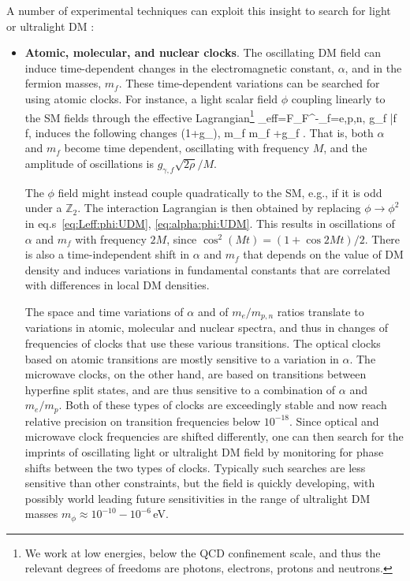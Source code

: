 A number of experimental techniques can exploit this insight to search for light or ultralight DM \cite{ultra:light:DM}:
\begin{itemize}
\item[$\diamond$]
{\bf Atomic, molecular, and nuclear clocks}. 
The oscillating DM field can induce time-dependent changes in the electromagnetic constant, $\alpha$, and in the fermion masses, $m_f$.
These time-dependent variations can be searched for using atomic clocks. 
For instance, a light scalar field $\phi$ coupling linearly to the SM fields through the effective Lagrangian\footnote{We work at low energies, below the QCD confinement scale, and thus the relevant degrees of freedoms are photons, electrons, protons and neutrons.}
\beq
\label{eq:Leff:phi:UDM}
\Lag_{\rm eff}=\phi F_{\mu\nu}F^{\mu\nu}-\sum_{f=e,p,n,} g_f \phi \bar f f,
\eeq
induces the following changes 
\beq
\label{eq:alpha:phi:UDM}
\alpha\to {}\simeq \alpha  \big(1+g_\gamma\phi \big), \qquad m_f \to m_f +g_f \phi.
\eeq
That is, both $\alpha$ and $m_f$ become time dependent, 
oscillating with frequency $M$, and the amplitude of oscillations is $g_{\gamma,f}\sqrt{2 \rho}/M$. 

The $\phi$ field might instead couple quadratically to the SM, e.g., if it is odd under a $\mathbb{Z}_2$. 
The interaction Lagrangian is then obtained by replacing $\phi\to \phi^2$ in eq.s~\eqref{eq:Leff:phi:UDM}, \eqref{eq:alpha:phi:UDM}.   
This results in oscillations of $\alpha$ and $m_f$ with frequency $2M$, since $\cos^2(M t)=(1+\cos 2Mt )/2$. There is also a time-independent shift in $\alpha$ and $m_f$ that depends on the value of DM density and induces variations in fundamental constants that are correlated with differences in local DM densities. 

The space and time variations of $\alpha$ and of $m_e/m_{p,n}$ ratios 
translate to variations in atomic, molecular and nuclear spectra, 
and thus in changes of frequencies of clocks that use these various transitions. 
The optical clocks based on atomic transitions are mostly sensitive to a variation in $\alpha$. The microwave clocks, on the other hand,  are based on transitions between hyperfine split states, and are thus sensitive to a combination of $\alpha$ and $m_e/m_p$. Both of these types of clocks are exceedingly stable and now reach relative precision on transition frequencies below $10^{-18}$. 
Since optical and microwave clock frequencies are shifted differently,
one can then search for the imprints of oscillating light or ultralight DM field by monitoring for phase shifts between the two types of clocks. Typically such searches are less sensitive than other constraints, but the field is quickly developing, with possibly world leading future sensitivities in the range of ultralight DM masses $m_\phi\approx 10^{-10}-10^{-6}$\,eV. 



\end{itemize}
